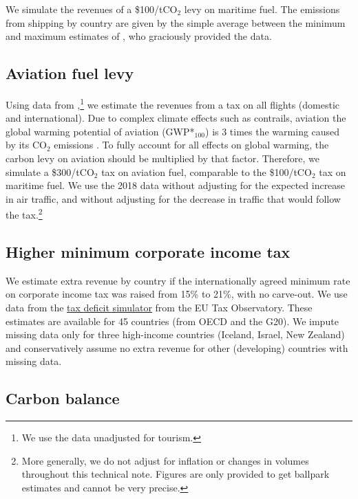 \documentclass[12pt,english]{article}
\begin{document}
\begin{bibunit}
We simulate the revenues of a \$100/tCO$_\text{2}$ levy on maritime fuel. The emissions from shipping by country are given by the simple average between the minimum and maximum estimates of \citet{dequiedt_navigating_2024}, who graciously provided the data. 

\subsection*{Aviation fuel levy}\label{sec:wealth}

Using data from \cite{graver_CO2_2018},\footnote{We use the data unadjusted for tourism.} we estimate the revenues from a tax on all flights (domestic and international). Due to complex climate effects such as contrails, aviation the global warming potential of aviation (GWP*$_\text{100}$) is 3 times the warming caused by its CO$_\text{2}$ emissions \citep{lee_contribution_2021}. To fully account for all effects on global warming, the carbon levy on aviation should be multiplied by that factor. Therefore, we simulate a \$300/tCO$_\text{2}$ tax on aviation fuel, comparable to the \$100/tCO$_\text{2}$ tax on maritime fuel. We use the 2018 data without adjusting for the expected increase in air traffic, and without adjusting for the decrease in traffic that would follow the tax.\footnote{More generally, we do not adjust for inflation or changes in volumes throughout this technical note. Figures are only provided to get ballpark estimates and cannot be very precise.}

\subsection*{Higher minimum corporate income tax}

We estimate extra revenue by country if the internationally agreed minimum rate on corporate income tax was raised from 15\% to 21\%, with no carve-out. We use data from the \href{https://www.taxobservatory.eu/fr/base-de-donn%C3%A9es/the-tax-deficit-simulator/}{tax deficit simulator} from the EU Tax Observatory. These estimates are available for 45 countries (from OECD and the G20). We impute missing data only for three high-income countries (Iceland, Israel, New Zealand) and conservatively assume no extra revenue for other (developing) countries with missing data.

\subsection*{Carbon balance}


\end{bibunit}
\end{document}
